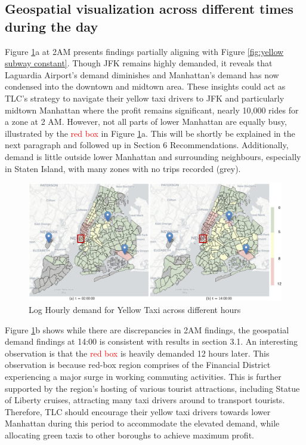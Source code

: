 \documentclass[11pt]{article}
\begin{document}
\subsection{Geospatial visualization across different times during the day}
Figure \ref{fig:geospatial time}a at 2AM presents findings partially aligning with Figure \ref{fig:yellow subway constant}. Though JFK remains highly demanded, it reveals that Laguardia Airport's demand diminishes and Manhattan's demand has now condensed into the downtown and midtown area. These insights could act as TLC's strategy to navigate their yellow taxi drivers to JFK and particularly midtown Manhattan where the profit remains significant, nearly 10,000 rides for a zone at 2 AM. However, not all parts of lower Manhattan are equally busy, illustrated by the \textcolor{red}{red box} in Figure \ref{fig:geospatial time}a. This will be shortly be explained in the next paragraph and followed up in Section 6 Recommendations. Additionally, demand is little outside lower Manhattan and surrounding neighbours, especially in Staten Island, with many zones with no trips recorded (grey).


\begin{figure}[ht]
    \centering
    \includegraphics[width=1.0\textwidth]{plots/Figure 1.pdf}
    \caption{Log Hourly demand for Yellow Taxi across different hours}
    \label{fig:geospatial time}
\end{figure}

Figure \ref{fig:geospatial time}b shows while there are discrepancies in 2AM findings, the geospatial demand findings at 14:00 is consistent with results in section 3.1. An interesting observation is that the \textcolor{red}{red box} is heavily demanded 12 hours later. This observation is because red-box region comprises of the Financial District experiencing a major surge in working commuting activities. This is further supported by the region's hosting of various tourist attractions, including Statue of Liberty cruises, attracting many taxi drivers around to transport tourists. Therefore, TLC should encourage their yellow taxi drivers towards lower Manhattan during this period to accommodate the elevated demand, while allocating green taxis to other boroughs to achieve maximum profit.
\end{document}
